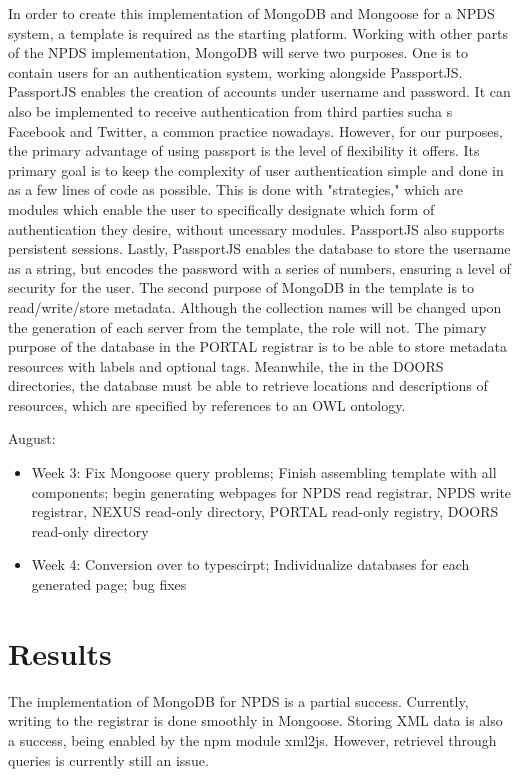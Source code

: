 \documentclass[10pt,twocolumn,twoside]{article}
\begin{document}
	In order to create this implementation of MongoDB and Mongoose for a NPDS system, a template is required as the starting platform. Working with other parts of the NPDS implementation, MongoDB will serve two purposes. One is to contain users for an authentication system, working alongside PassportJS. PassportJS enables the creation of accounts under username and password. It can also be implemented to receive authentication from third parties sucha s Facebook and Twitter, a common practice nowadays. However, for our purposes, the primary advantage of using passport is the level of flexibility it offers. Its primary goal is to keep the complexity of user authentication simple and done in as a few lines of code as possible. This is done with "strategies," which are modules which enable the user to specifically designate which form of authentication they desire, without uncessary modules. PassportJS also supports persistent sessions. Lastly, PassportJS enables the database to store the username as a string, but encodes the password with a series of numbers, ensuring a level of security for the user. The second purpose of MongoDB in the template is to read/write/store metadata. Although the collection names will be changed upon the generation of each server from the template, the role will not. The pimary purpose of the database in the PORTAL registrar is to be able to store metadata resources with labels and optional tags. Meanwhile, the in the DOORS directories, the database must be able to retrieve locations and descriptions of resources, which are specified by references to an OWL ontology.

August:
\begin{itemize}
	\item Week 3: Fix Mongoose query problems; Finish assembling template with all components; begin generating webpages for NPDS read registrar, NPDS write registrar, NEXUS read-only directory, PORTAL read-only registry, DOORS read-only directory
	\item Week 4: Conversion over to typescirpt; Individualize databases for each generated page; bug fixes
\end{itemize}
	

\section*{Results}
	The implementation of MongoDB for NPDS is a partial success. Currently, writing to the registrar is done smoothly in Mongoose. Storing XML data is also a success, being enabled by the npm module xml2js. However, retrievel through queries is currently still an issue. 
\end{document}
